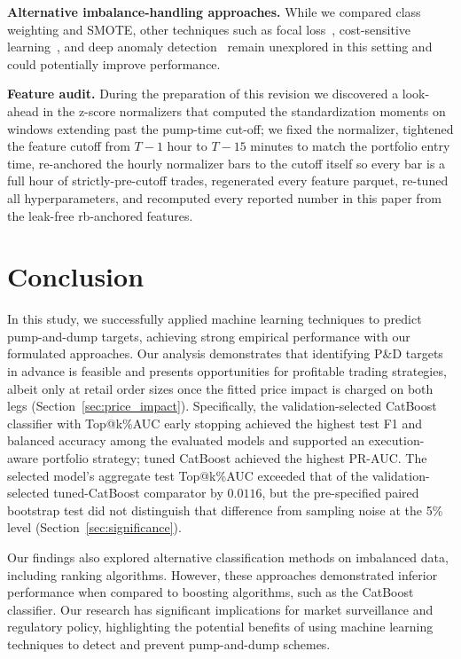 \documentclass{ieeeaccess}
\begin{document}
\textbf{Alternative imbalance-handling approaches.}
While we compared class weighting and SMOTE, other techniques such as focal loss~\cite{lin2017focal}, cost-sensitive learning~\cite{elkan2001cost}, and deep anomaly detection~\cite{liu2008isolation} remain unexplored in this setting and could potentially improve performance.

\textbf{Feature audit.}
During the preparation of this revision we discovered a look-ahead in the z-score normalizers that computed the standardization moments on windows extending past the pump-time cut-off; we fixed the normalizer, tightened the feature cutoff from $T-1$ hour to $T-15$ minutes to match the portfolio entry time, re-anchored the hourly normalizer bars to the cutoff itself so every bar is a full hour of strictly-pre-cutoff trades, regenerated every feature parquet, re-tuned all hyperparameters, and recomputed every reported number in this paper from the leak-free rb-anchored features.


\section{Conclusion}

In this study, we successfully applied machine learning techniques to predict pump-and-dump targets, achieving strong empirical performance with our formulated approaches. Our analysis demonstrates that identifying P\&D targets in advance is feasible and presents opportunities for profitable trading strategies, albeit only at retail order sizes once the fitted price impact is charged on both legs (Section~\ref{sec:price_impact}). Specifically, the validation-selected CatBoost classifier with Top@k\%AUC early stopping achieved the highest test F1 and balanced accuracy among the evaluated models and supported an execution-aware portfolio strategy; tuned CatBoost achieved the highest PR-AUC. The selected model's aggregate test Top@k\%AUC exceeded that of the validation-selected tuned-CatBoost comparator by $0.0116$, but the pre-specified paired bootstrap test did not distinguish that difference from sampling noise at the 5\% level (Section~\ref{sec:significance}).

Our findings also explored alternative classification methods on imbalanced data, including ranking algorithms. However, these approaches demonstrated inferior performance when compared to boosting algorithms, such as the CatBoost classifier. Our research has significant implications for market surveillance and regulatory policy, highlighting the potential benefits of using machine learning techniques to detect and prevent pump-and-dump schemes.
\end{document}
